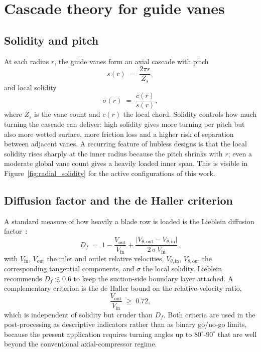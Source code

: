 \section{Cascade theory for guide vanes}
\label{sec:theory_cascade}
 
\subsection{Solidity and pitch}
\label{sec:theory_solidity}
 
At each radius $r$, the guide vanes form an axial cascade with pitch
\begin{equation}
s(r) \;=\; \frac{2\pi r}{Z_s},
\label{eq:pitch}
\end{equation}
and local solidity
\begin{equation}
\sigma(r) \;=\; \frac{c(r)}{s(r)},
\label{eq:solidity}
\end{equation}
where $Z_s$ is the vane count and $c(r)$ the local chord. Solidity controls how much turning the cascade can deliver: high solidity gives more turning per pitch but also more wetted surface, more friction loss and a higher risk of separation between adjacent vanes. A recurring feature of hubless designs is that the local solidity rises sharply at the inner radius because the pitch shrinks with $r$; even a moderate global vane count gives a heavily loaded inner span. This is visible in Figure~\ref{fig:radial_solidity} for the active configurations of this work.
 
\subsection{Diffusion factor and the de Haller criterion}
\label{sec:theory_diffusion}
 
A standard measure of how heavily a blade row is loaded is the Lieblein diffusion factor~\cite{Lieblein1953}:
\begin{equation}
D_f \;=\; 1 - \frac{V_{\mathrm{out}}}{V_{\mathrm{in}}}
       + \frac{\lvert V_{\theta,\mathrm{out}} - V_{\theta,\mathrm{in}} \rvert}
              {2\,\sigma\, V_{\mathrm{in}}},
\label{eq:Df}
\end{equation}
with $V_{\mathrm{in}}$, $V_{\mathrm{out}}$ the inlet and outlet relative velocities, $V_{\theta,\mathrm{in}}$, $V_{\theta,\mathrm{out}}$ the corresponding tangential components, and $\sigma$ the local solidity. Lieblein recommends $D_f \lesssim 0.6$ to keep the suction-side boundary layer attached. A complementary criterion is the de Haller bound on the relative-velocity ratio,
\begin{equation}
\frac{V_{\mathrm{out}}}{V_{\mathrm{in}}} \;\geq\; 0.72,
\label{eq:deHaller}
\end{equation}
which is independent of solidity but cruder than $D_f$. Both criteria are used in the post-processing as descriptive indicators rather than as binary go/no-go limits, because the present application requires turning angles up to $80^\circ$-$90^\circ$ that are well beyond the conventional axial-compressor regime.
 
